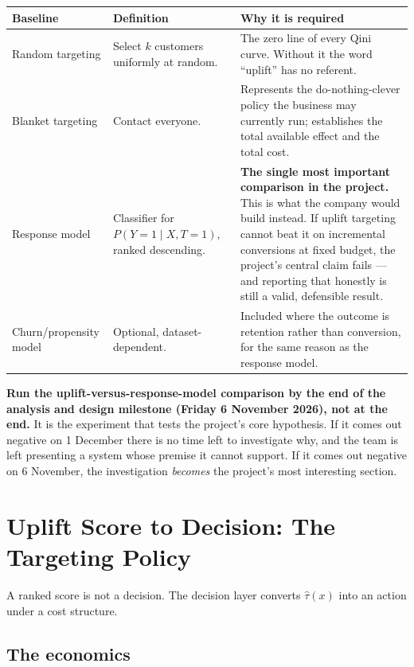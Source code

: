 \documentclass[11pt,a4paper]{article}
\begin{document}
\begin{tabularx}{\textwidth}{@{}L{3.4cm}L{4.4cm}X@{}}
\toprule
\textbf{Baseline} & \textbf{Definition} & \textbf{Why it is required} \\
\midrule
Random targeting & Select $k$ customers uniformly at random. & The zero line of every Qini curve.
Without it the word ``uplift'' has no referent. \\
Blanket targeting & Contact everyone. & Represents the do-nothing-clever policy the business may
currently run; establishes the total available effect and the total cost. \\
Response model & Classifier for $P(Y{=}1 \mid X, T{=}1)$, ranked descending. & \textbf{The single
most important comparison in the project.} This is what the company would build instead. If uplift
targeting cannot beat it on incremental conversions at fixed budget, the project's central claim
fails --- and reporting that honestly is still a valid, defensible result. \\
Churn/propensity model & Optional, dataset-dependent. & Included where the outcome is retention
rather than conversion, for the same reason as the response model. \\
\bottomrule
\end{tabularx}

\begin{alertbox}
\textbf{Run the uplift-versus-response-model comparison by the end of the analysis and design
milestone (Friday 6 November 2026), not at the end.} It is the experiment that tests the project's
core hypothesis. If it comes out negative on 1 December there is no time left to investigate why,
and the team is left presenting a system whose premise it cannot support. If it comes out negative
on 6 November, the investigation \emph{becomes} the project's most interesting section.
\end{alertbox}

\section{Uplift Score to Decision: The Targeting Policy}
\label{sec:decision}

A ranked score is not a decision. The decision layer converts $\hat\tau(x)$ into an action under a
cost structure.

\subsection{The economics}
\end{document}
